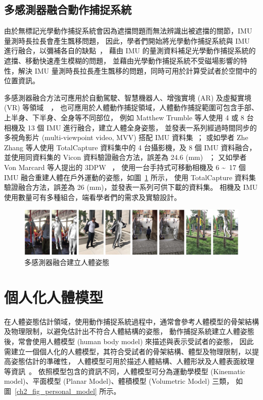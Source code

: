\subsection{多感測器融合動作捕捉系統}
由於無標記光學動作捕捉系統會因為遮擋問題而無法辨識出被遮擋的關節，IMU 量測時長拉長會產生飄移問題，
因此，學者們開始將光學動作捕捉系統與 IMU 進行融合，以彌補各自的缺點~\cite{li2023visual}，
藉由 IMU 的量測資料補足光學動作捕捉系統的遮擋、移動快速產生模糊的問題，
並藉由光學動作捕捉系統不受磁場影響的特性，解決 IMU 量測時長拉長產生飄移的問題，同時可用於計算受試者於空間中的位置資訊。

多感測器融合方法可應用於自動駕駛、智慧機器人、增強實境 (AR) 及虛擬實境 (VR) 等領域~\cite{jinyu2019survey}~\cite{zhu2023camera}，
也可應用於人體動作捕捉領域，人體動作捕捉範圍可包含手部、上半身、下半身、全身等不同部位，
例如 Matthew Trumble 等人使用 4 或 8 台相機及 13 個 IMU 進行融合，建立人體全身姿態，
並發表一系列經過時間同步的多視角影片 (multi-viewpoint video, MVV) 搭配 IMU 資料集~\cite{Trumble:BMVC:2017}；
或如學者 Zhe Zhang 等人使用 TotalCapture 資料集中的 4 台攝影機，及 8 個 IMU 資料融合，
並使用同資料集的 Vicon 資料驗證融合方法，誤差為 24.6 (mm) ~\cite{Zhang_2020_CVPR}；
又如學者 Von Marcard 等人提出的 3DPW ~\cite{vonMarcard2018}，
使用一台手持式可移動相機及 6 \textasciitilde\ 17 個 IMU 融合重建人體在戶外運動的姿態，如圖~\ref{ch2_fig_3DPW} 所示，
使用 TotalCapture 資料集驗證融合方法，誤差為 26 (mm)，並發表一系列可供下載的資料集。
相機及 IMU 使用數量可有多種組合，端看學者們的需求及實驗設計。

\begin{figure}[!ht]
    \centering
    \includegraphics[width=\linewidth]{figure/ch2_fig_3DPW.png}
     \caption[多感測器融合建立人體姿態]{多感測器融合建立人體姿態}
     \label{ch2_fig_3DPW}
\end{figure}

\section{個人化人體模型}
在人體姿態估計領域，使用動作捕捉系統過程中，通常會參考人體模型的骨架結構及物理限制，以避免估計出不符合人體結構的姿態，
動作捕捉系統建立人體姿態後，常會使用人體模型 (human body model) 來描述與表示受試者的姿態，
因此需建立一個個人化的人體模型，其符合受試者的骨架結構、體型及物理限制，以提高姿態估計的準確性，
人體模型可用於描述人體結構、人體形狀及人體表面紋理等資訊~\cite{gong2016human}。
依照模型包含的資訊不同，人體模型可分為運動學模型 (Kinematic model)、平面模型 (Planar Model)、體積模型 (Volumetric Model) 三類，
如圖~\ref{ch2_fig_personal_model} 所示。

